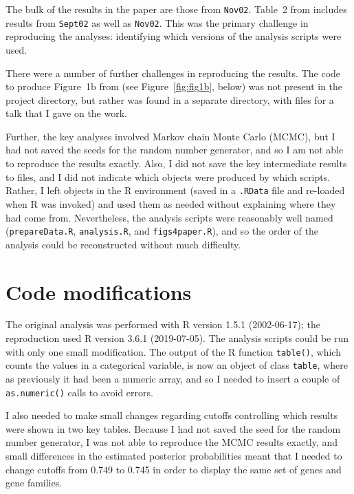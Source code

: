 The bulk of the results in the paper are those from {\tt Nov02}.
Table~2 from \citet{lamichhane2003} includes results from {\tt Sept02}
as well as {\tt Nov02}. This was the primary challenge in reproducing
the analyses: identifying which versions of the analysis
scripts were used.

There were a number of further challenges in reproducing the results.
The code to produce Figure~1b from \citet{lamichhane2003} (see
Figure~\ref{fig:fig1b}, below) was not
present in the project directory, but rather was found in a separate
directory, with files for a talk that I gave on the work.

Further, the key analyses involved Markov chain Monte Carlo (MCMC),
but I had not saved the seeds for the random number generator, and so
I am not able to reproduce the results exactly. Also, I did not save
the key intermediate results to files, and I did not indicate which
objects were produced by which scripts. Rather, I left objects in the
R environment (saved in a {\tt .RData} file and re-loaded when R was
invoked) and used them as needed without explaining where they had
come from. Nevertheless, the analysis scripts were reasonably well
named ({\tt prepareData.R}, {\tt analysis.R},
and {\tt figs4paper.R}), and so the order of the analysis could be
reconstructed without much difficulty.

\section{Code modifications}

The original analysis was performed with R version 1.5.1 (2002-06-17);
the reproduction used R version 3.6.1 (2019-07-05). The analysis
scripts could be run with only one small modification. The output of
the R function {\tt table()}, which counts the values in a
categorical variable, is now an object of class {\tt table}, where as
previously it had been a numeric array, and so
I needed to insert a couple of {\tt as.numeric()} calls to avoid
errors.

I also needed to make small changes regarding cutoffs controlling which results
were shown in two key tables. Because I had not saved the seed for
the random number generator, I was not able to reproduce the MCMC
results exactly, and small differences in the estimated posterior
probabilities meant that I needed to change cutoffs from 0.749 to
0.745 in order to display the same set of genes and gene families.




